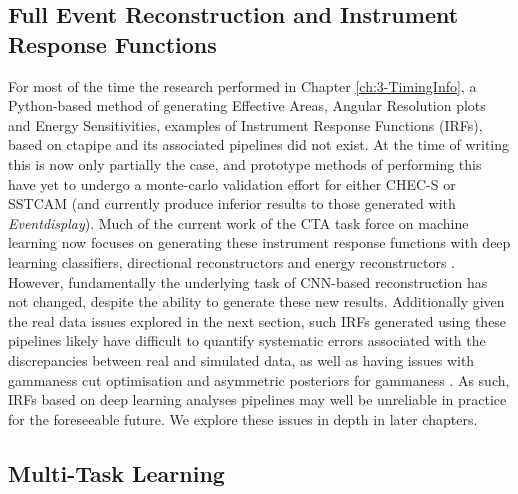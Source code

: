 \subsection{Full Event Reconstruction and Instrument Response Functions}
For most of the time the research performed in Chapter \ref{ch:3-TimingInfo}, a Python-based method of generating Effective Areas, Angular Resolution plots and Energy Sensitivities, examples of Instrument Response Functions (IRFs), based on ctapipe and its associated pipelines did not exist. At the time of writing this is now only partially the case, and prototype methods of performing this have yet to undergo a monte-carlo validation effort for either CHEC-S or SSTCAM (and currently produce inferior results to those generated with \textit{Eventdisplay}). Much of the current work of the CTA task force on machine learning now focuses on generating these instrument response functions with deep learning classifiers, directional reconstructors and energy reconstructors \cite{tjarkicrc}. However, fundamentally the underlying task of CNN-based reconstruction has not changed, despite the ability to generate these new results. Additionally given the real data issues explored in the next section, such IRFs generated using these pipelines likely have difficult to quantify systematic errors associated with the discrepancies between real and simulated data, as well as having issues with gammaness cut optimisation and asymmetric posteriors for gammaness \cite{mike}. As such, IRFs based on deep learning analyses pipelines may well be unreliable in practice for the foreseeable future. We explore these issues in depth in later chapters.

\subsection{Multi-Task Learning}

